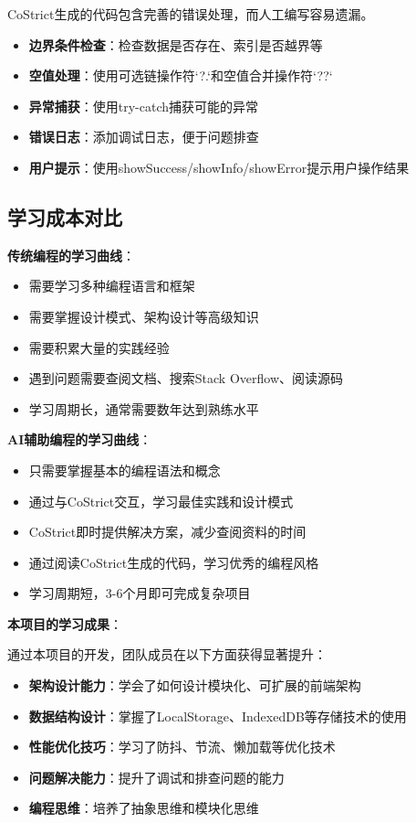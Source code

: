 ﻿\documentclass[12pt,a4paper]{article}
\begin{document}
CoStrict生成的代码包含完善的错误处理，而人工编写容易遗漏。

\begin{itemize}
    \item \textbf{边界条件检查}：检查数据是否存在、索引是否越界等
    \item \textbf{空值处理}：使用可选链操作符`?.`和空值合并操作符`??`
    \item \textbf{异常捕获}：使用try-catch捕获可能的异常
    \item \textbf{错误日志}：添加调试日志，便于问题排查
    \item \textbf{用户提示}：使用showSuccess/showInfo/showError提示用户操作结果
\end{itemize}

\subsection{学习成本对比}

\textbf{传统编程的学习曲线}：

\begin{itemize}
    \item 需要学习多种编程语言和框架
    \item 需要掌握设计模式、架构设计等高级知识
    \item 需要积累大量的实践经验
    \item 遇到问题需要查阅文档、搜索Stack Overflow、阅读源码
    \item 学习周期长，通常需要数年达到熟练水平
\end{itemize}

\textbf{AI辅助编程的学习曲线}：

\begin{itemize}
    \item 只需要掌握基本的编程语法和概念
    \item 通过与CoStrict交互，学习最佳实践和设计模式
    \item CoStrict即时提供解决方案，减少查阅资料的时间
    \item 通过阅读CoStrict生成的代码，学习优秀的编程风格
    \item 学习周期短，3-6个月即可完成复杂项目
\end{itemize}

\textbf{本项目的学习成果}：

通过本项目的开发，团队成员在以下方面获得显著提升：

\begin{itemize}
    \item \textbf{架构设计能力}：学会了如何设计模块化、可扩展的前端架构
    \item \textbf{数据结构设计}：掌握了LocalStorage、IndexedDB等存储技术的使用
    \item \textbf{性能优化技巧}：学习了防抖、节流、懒加载等优化技术
    \item \textbf{问题解决能力}：提升了调试和排查问题的能力
    \item \textbf{编程思维}：培养了抽象思维和模块化思维
\end{itemize}
\end{document}
